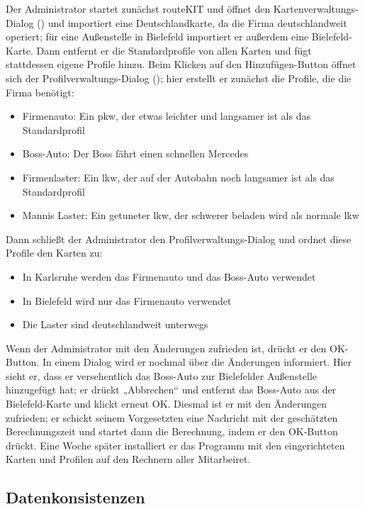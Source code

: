 \documentclass[a4paper, 11pt]{article}
\begin{document}
\begin{description}
Der Administrator startet zunächst routeKIT und öffnet den Kartenverwaltungs-Dialog () und importiert eine Deutschlandkarte, da die Firma deutschlandweit operiert; für eine Außenstelle in Bielefeld importiert er außerdem eine Bielefeld-Karte. Dann entfernt er die Standardprofile von allen Karten und fügt stattdessen eigene Profile hinzu. Beim Klicken auf den Hinzufügen-Button öffnet sich der Profilverwaltungs-Dialog (); hier erstellt er zunächst die Profile, die die Firma benötigt:
\begin{itemize}
\item Firmenauto: Ein \gls{pkw}, der etwas leichter und langsamer ist als das Standardprofil
\item Boss-Auto: Der Boss fährt einen schnellen Mercedes
\item Firmenlaster: Ein \gls{lkw}, der auf der Autobahn noch langsamer ist als das Standardprofil
\item Mannis Laster: Ein getuneter \gls{lkw}, der schwerer beladen wird als normale \gls{lkw}
\end{itemize}
Dann schließt der Administrator den Profilverwaltungs-Dialog und ordnet diese Profile den Karten zu:
\begin{itemize}
\item In Karlsruhe werden das Firmenauto und das Boss-Auto verwendet
\item In Bielefeld wird nur das Firmenauto verwendet
\item Die Laster sind deutschlandweit unterwegs
\end{itemize}
Wenn der Administrator mit den Änderungen zufrieden ist, drückt er den OK-Button. In einem Dialog wird er nochmal über die Änderungen informiert. Hier sieht er, dass er versehentlich das Boss-Auto zur Bielefelder Außenstelle hinzugefügt hat; er drückt „Abbrechen“ und entfernt das Boss-Auto aus der Bielefeld-Karte und klickt erneut OK. Diesmal ist er mit den Änderungen zufrieden; er schickt seinem Vorgesetzten eine Nachricht mit der geschätzten Berechnungszeit und startet dann die Berechnung, indem er den OK-Button drückt. Eine Woche später installiert er das Programm mit den eingerichteten Karten und Profilen auf den Rechnern aller Mitarbeiret.
\end{description}

\subsection{Datenkonsistenzen}
\end{document}
